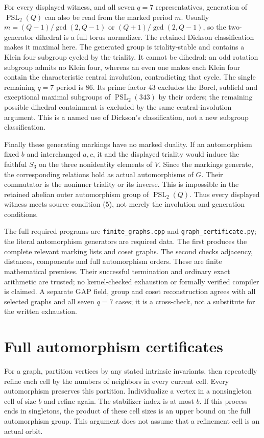 \documentclass[11pt,a4paper]{article}
\newcommand{\PSL}{\operatorname{PSL}}\newcommand{\PGL}{\operatorname{PGL}}
\begin{document}
For every displayed witness, and all seven $q=7$ representatives,
generation of $\PSL_2(Q)$ can also be read from the marked period $m$.
Usually $m=(Q-1)/\gcd(2,Q-1)$ or $(Q+1)/\gcd(2,Q-1)$, so the two-generator
dihedral is a full torus normalizer. The retained Dickson classification
makes it maximal here. The generated group is triality-stable and contains
a Klein four subgroup cycled by the triality. It cannot be dihedral:
an odd rotation subgroup admits no Klein four, whereas an even one makes
each Klein four contain the characteristic central involution, contradicting
that cycle. The single remaining $q=7$ period is $86$. Its prime factor
$43$ excludes the Borel, subfield and exceptional maximal subgroups of
$\PSL_2(343)$ by their orders; the remaining possible dihedral containment
is excluded by the same central-involution argument. This is a named use
of Dickson's classification, not a new subgroup classification.

Finally these generating markings have no marked duality. If an automorphism
fixed $b$ and interchanged $a,c$, it and the displayed triality would induce
the faithful $S_3$ on the three nonidentity elements of $V$. Since the markings
generate, the corresponding relations hold as actual automorphisms of $G$.
Their commutator is the noninner triality or its inverse. This is impossible
in the retained abelian outer automorphism group of $\PSL_2(Q)$.
Thus every displayed witness meets source condition (5), not merely the
involution and generation conditions.

The full required programs are \texttt{finite\_graphs.cpp} and
\texttt{graph\_certificate.py}; the literal automorphism generators are
required data. The first produces the complete relevant marking lists and
coset graphs. The second checks adjacency, distances, components and full
automorphism orders. These are finite mathematical premises. Their successful
termination and ordinary exact arithmetic are trusted; no kernel-checked
exhaustion or formally verified compiler is claimed. A separate GAP field,
group and coset reconstruction agrees with all selected graphs and all seven
$q=7$ cases; it is a cross-check, not a substitute for the written exhaustion.

\section{Full automorphism certificates}
For a graph, partition vertices by any stated intrinsic invariants, then
repeatedly refine each cell by the numbers of neighbors in every current
cell. Every automorphism preserves this partition. Individualize a vertex
in a nonsingleton cell of size $b$ and refine again. The stabilizer index
is at most $b$. If this process ends in singletons, the product of these
cell sizes is an upper bound on the full automorphism group. This argument
does not assume that a refinement cell is an actual orbit.
\end{document}
